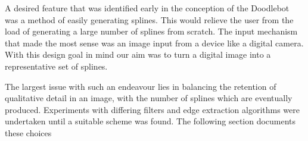 A desired feature that was identified early in the conception of the Doodlebot was a method of easily generating splines. This would relieve the user from the load of generating a large number of splines from scratch. The input mechanism that made the most sense was an image input from a device like a digital camera. With this design goal in mind our aim was to turn a digital image into a representative set of splines.

The largest issue with such an endeavour lies in balancing the retention of qualitative detail in an image, with the number of splines which are eventually produced. Experiments with differing filters and edge extraction algorithms were undertaken until a suitable scheme was found. The following section documents these choices